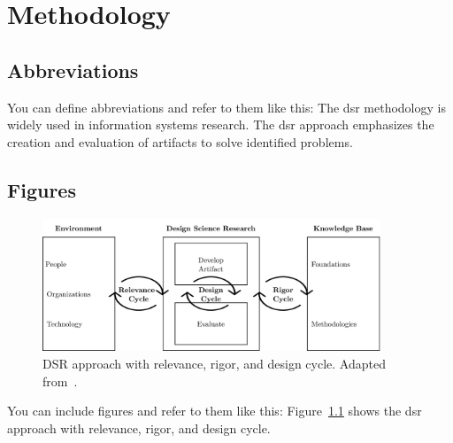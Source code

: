 \chapter{Methodology}
\label{chap:methodology}

\section{Abbreviations}

You can define abbreviations and refer to them like this: The \gls{dsr} methodology is widely used in information systems research. The \gls{dsr} approach emphasizes the creation and evaluation of artifacts to solve identified problems.

\section{Figures}

\begin{figure}[htbp!]
    \centering
    \includegraphics[width=0.9\textwidth]{figures/design-science-generic.png}
    \caption[DSR approach with relevance, rigor, and design cycle.]{DSR approach with relevance, rigor, and design cycle. Adapted from~\textcite{hevner2004design}.}
    \label{fig:design-science-generic}
\end{figure}

You can include figures and refer to them like this: Figure~\ref{fig:design-science-generic} shows the \gls{dsr} approach with relevance, rigor, and design cycle.
